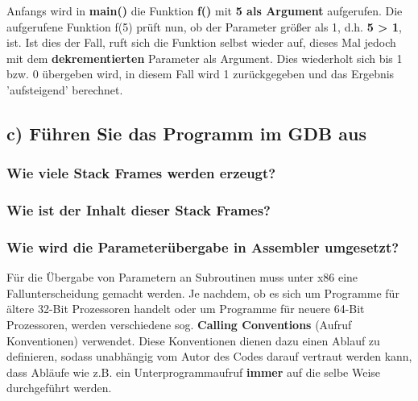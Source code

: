 \documentclass[12pt]{article}
\begin{document}
{Anfangs wird in \textbf{main()} die Funktion \textbf{f()} mit \textbf{5 als Argument} aufgerufen. Die aufgerufene Funktion f(5) prüft nun, ob der Parameter größer als 1, d.h. \textbf{5 > 1}, ist. Ist dies der Fall, ruft sich die Funktion selbst wieder auf, dieses Mal jedoch mit dem \textbf{dekrementierten} Parameter als Argument. Dies wiederholt sich bis 1 bzw. 0 übergeben wird, in diesem Fall wird 1 zurückgegeben und das Ergebnis 'aufsteigend' berechnet.

\subsection{c) Führen Sie das Programm im GDB aus}




\subsubsection{Wie viele Stack Frames werden erzeugt?}

\subsubsection{Wie ist der Inhalt dieser Stack Frames?}

\subsubsection{Wie wird die Parameterübergabe in Assembler umgesetzt?}
Für die Übergabe von Parametern an Subroutinen muss unter x86 eine Fallunterscheidung gemacht werden. Je nachdem, ob es sich um Programme für ältere 32-Bit Prozessoren handelt oder um Programme für neuere 64-Bit Prozessoren, werden verschiedene sog. \textbf{Calling Conventions} (Aufruf Konventionen) verwendet. Diese Konventionen dienen dazu einen Ablauf zu definieren, sodass unabhängig vom Autor des Codes darauf vertraut werden kann, dass Abläufe wie z.B. ein Unterprogrammaufruf \textbf{immer} auf die selbe Weise durchgeführt werden.

}
\end{document}
